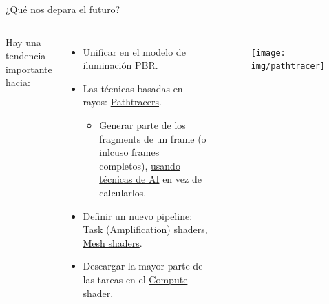 \begin{frame}{¿Qué nos depara el futuro?}
\begin{columns}
    Hay una tendencia importante hacia:
    \begin{itemize}
        \item Unificar en el modelo de \href{https://en.wikipedia.org/wiki/Physically_based_rendering}{iluminación PBR}.
        \item Las técnicas basadas en rayos: \href{https://en.wikipedia.org/wiki/Path_tracing}{Pathtracers}.
        \begin{itemize}
            \item Generar parte de los fragments de un frame (o inlcuso frames completos), \href{https://www.youtube.com/watch?v=5PHBXY0FI5o&t=2s}{usando técnicas de AI} en vez de calcularlos.
        \end{itemize}
        \item Definir un nuevo pipeline: Task (Amplification) shaders, \href{https://www.khronos.org/blog/mesh-shading-for-vulkan}{Mesh shaders}.
        \item Descargar la mayor parte de las tareas en el \href{https://en.wikipedia.org/wiki/Compute_kernel}{Compute shader}.
    \end{itemize}
\begin{figure}[htp]
  \centering
  \texttt{[image: img/pathtracer]}
\end{figure}
\end{columns}
\end{frame}

